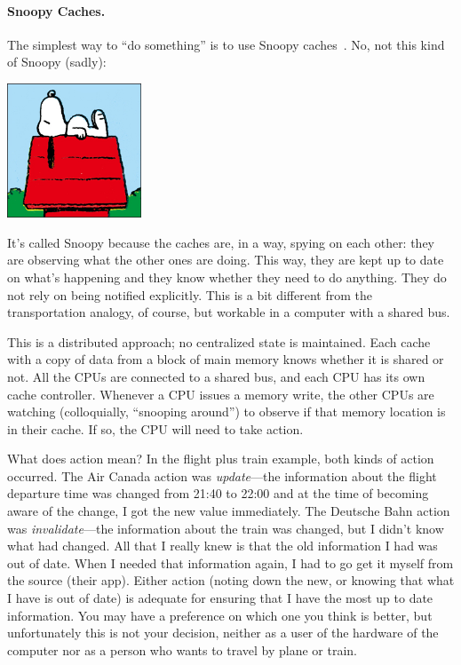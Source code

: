 \documentclass[a4paper]{report}
\begin{document}
\paragraph{Snoopy Caches.} The simplest way to ``do something''
is to use Snoopy caches~\cite{snoopycache}. No, not this kind of Snoopy (sadly):

\begin{center}
	\includegraphics[width=0.3\textwidth]{images/peanuts-snoopy1.jpg}
\end{center}

It's called Snoopy because the caches are, in a way, spying on each other: they are observing what the other ones are doing. This way, they are kept up to date on what's happening and they know whether they need to do anything. They do not rely on being notified explicitly. This is a bit different from the transportation analogy, of course, but workable in a computer with a shared bus.

This is a distributed approach; no centralized state is maintained. Each cache with a copy of data from a block of main memory knows whether it is shared or not. All the CPUs are connected to a shared bus, and each CPU has its own cache controller. Whenever a CPU issues a memory write, the other CPUs are watching (colloquially, ``snooping around'') to observe if that memory location is in their cache. If so, the CPU will need to take action.

What does action mean? In the flight plus train example, both kinds of action occurred. The Air Canada action was \textit{update}---the information about the flight departure time was changed from 21:40 to 22:00 and at the time of becoming aware of the change, I got the new value immediately. The Deutsche Bahn action was \textit{invalidate}---the information about the train was changed, but I didn't know what had changed. All that I really knew is that the old information I had was out of date. When I needed that information again, I had to go get it myself from the source (their app). Either action (noting down the new, or knowing that what I have is out of date) is adequate for ensuring that I have the most up to date information. You may have a preference on which one you think is better, but unfortunately this is not your decision, neither as a user of the hardware of the computer nor as  a person who wants to travel by plane or train.
\end{document}
